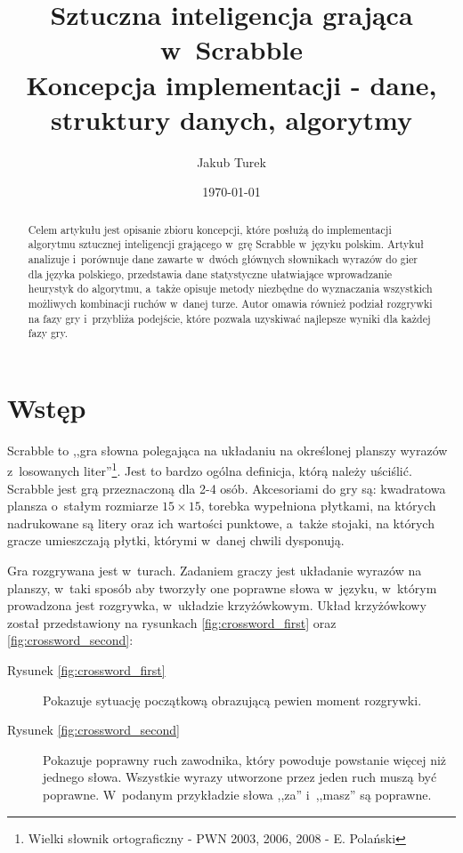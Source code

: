 \documentclass[a4paper,twocolumn,12pt]{article}
\title{\LARGE{Sztuczna inteligencja grająca w~Scrabble} \\ \vspace{2mm} \large{Koncepcja implementacji - dane, struktury danych, algorytmy}}
\author{Jakub Turek}
\date{\today}
\begin{document}
\maketitle

\begin{abstract}
Celem artykułu jest opisanie zbioru koncepcji, które posłużą do implementacji algorytmu sztucznej inteligencji grającego w~grę Scrabble w~języku polskim. Artykuł analizuje i~porównuje dane zawarte w~dwóch głównych słownikach wyrazów do gier dla języka polskiego, przedstawia dane statystyczne ułatwiające wprowadzanie heurystyk do algorytmu, a~także opisuje metody niezbędne do wyznaczania wszystkich możliwych kombinacji ruchów w~danej turze. Autor omawia również podział rozgrywki na fazy gry i~przybliża podejście, które pozwala uzyskiwać najlepsze wyniki dla każdej fazy gry.
\end{abstract}

\section*{Wstęp}

Scrabble to ,,gra słowna polegająca na układaniu na określonej planszy wyrazów z~losowanych liter''\footnote{Wielki słownik ortograficzny - PWN 2003, 2006, 2008 - E. Polański}. Jest to bardzo ogólna definicja, którą należy uściślić. Scrabble jest grą przeznaczoną dla 2-4 osób. Akcesoriami do gry są: kwadratowa plansza o~stałym rozmiarze $15 \times 15$, torebka wypełniona płytkami, na których nadrukowane są litery oraz ich wartości punktowe, a~także stojaki, na których gracze umieszczają płytki, którymi w~danej chwili dysponują.

Gra rozgrywana jest w~turach. Zadaniem graczy jest układanie wyrazów na planszy, w~taki sposób aby tworzyły one poprawne słowa w~języku, w~którym prowadzona jest rozgrywka, w~układzie krzyżówkowym. Układ krzyżówkowy został przedstawiony na rysunkach \ref{fig:crossword_first} oraz \ref{fig:crossword_second}:

\begin{description}
 \item [Rysunek \ref{fig:crossword_first}] Pokazuje sytuację początkową obrazującą pewien moment rozgrywki.
 \item [Rysunek \ref{fig:crossword_second}] Pokazuje poprawny ruch zawodnika, który powoduje powstanie więcej niż jednego słowa. Wszystkie wyrazy utworzone przez jeden ruch muszą być poprawne. W~podanym przykładzie słowa ,,za'' i~,,masz'' są poprawne.
\end{description}
\end{document}
